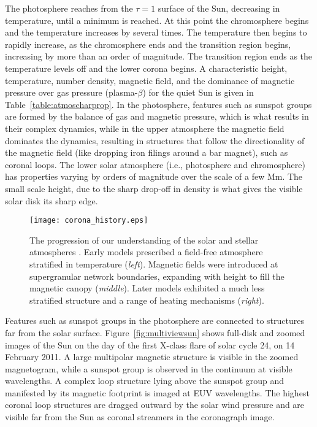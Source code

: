 The photosphere reaches from the $\tau=1$ surface of the Sun, decreasing in temperature, until a minimum is reached. At this point the chromosphere begins and the temperature increases by several times. The temperature then begins to rapidly increase, as the chromosphere ends and the transition region begins, increasing by more than an order of magnitude. The transition region ends as the temperature levels off and the lower corona begins. A characteristic height, temperature, number density, magnetic field, and the dominance of magnetic pressure over gas pressure (plasma-$\beta$) for the quiet Sun is given in Table~\ref{table:atmoscharprop}. In the photosphere, features such as sunspot groups are formed by the balance of gas and magnetic pressure, which is what results in their complex dynamics, while in the upper atmosphere the magnetic field dominates the dynamics, resulting in structures that follow the directionality of the magnetic field (like dropping iron filings around a bar magnet), such as coronal loops. The lower solar atmosphere (i.e., photosphere and chromosphere) has properties varying by orders of magnitude over the scale of a few Mm. The small scale height, due to the sharp drop-off in density is what gives the visible solar disk its sharp edge.

\begin{figure}[!t]
\centerline{\texttt{[image: corona\_history.eps]}}
\caption[The progression of our understanding of the solar and stellar atmospheres.]{The progression of our understanding of the solar and stellar atmospheres \citep[from][]{Schrijver:2001b}. Early models prescribed a field-free atmosphere stratified in temperature (\emph{left}). Magnetic fields were introduced at supergranular network boundaries, expanding with height to fill the magnetic canopy (\emph{middle}). Later models exhibited a much less stratified structure and a range of heating mechanisms (\emph{right}).}
\label{fig:coronahistory}
\end{figure}

Features such as sunspot groups in the photosphere are connected to structures far from the solar surface. Figure~\ref{fig:multiviewsun} shows full-disk and zoomed images of the Sun on the day of the first X-class flare of solar cycle 24, on 14 February 2011. A large multipolar magnetic structure is visible in the zoomed magnetogram, while a sunspot group is observed in the continuum at visible wavelengths. A complex loop structure lying above the sunspot group and manifested by its magnetic footprint is imaged at \gls{EUV} wavelengths. The highest coronal loop structures are dragged outward by the solar wind pressure and are visible far from the Sun as coronal streamers in the coronagraph image. 

